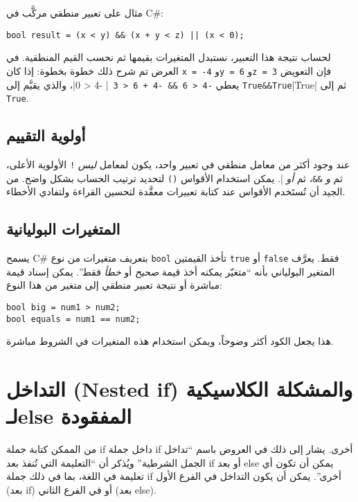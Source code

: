 ﻿\documentclass[12pt]{article}
\begin{document}
مثال على تعبير منطقي مركَّب في C\#:

\begin{english}
\begin{verbatim}
bool result = (x < y) && (x + y < z) || (x < 0);
\end{verbatim}
\end{english}

لحساب نتيجة هذا التعبير، نستبدل المتغيرات بقيمها ثم نحسب القيم المنطقية. في العرض تم شرح ذلك خطوة بخطوة: إذا كان \verb|x = -4| و\verb|y = 6| و\verb|z = 3| فإن التعويض يعطي \verb|-4 < 6 && -4 + 6 < 3 || -4 < 0|، والذي يقيَّم إلى \verb|True&&True||True| ثم إلى \verb|True|.

\subsection{أولوية التقييم}

عند وجود أكثر من معامل منطقي في تعبير واحد، يكون لمعامل \emph{ليس} \verb|!| الأولوية الأعلى، ثم \emph{و} \verb|&&|، ثم \emph{أو} \verb|||. يمكن استخدام الأقواس \verb|()| لتحديد ترتيب الحساب بشكل واضح. من الجيد أن تُستَخدم الأقواس عند كتابة تعبيرات معقَّدة لتحسين القراءة ولتفادي الأخطاء.

\subsection{المتغيرات البوليانية}

يسمح C\# بتعريف متغيرات من نوع \texttt{bool} تأخذ القيمتين \texttt{true} أو \texttt{false} فقط. يعرَّف المتغير البولياني بأنه ``متغيّر يمكنه أخذ قيمة \emph{صحيح} أو \emph{خطأ} فقط''. يمكن إسناد قيمة مباشرة أو نتيجة تعبير منطقي إلى متغير من هذا النوع:


\begin{english}
\begin{verbatim}
bool big = num1 > num2;
bool equals = num1 == num2;
\end{verbatim}
\end{english}

هذا يجعل الكود أكثر وضوحاً، ويمكن استخدام هذه المتغيرات في الشروط مباشرة.

\section{التداخل (\textenglish{Nested if}) والمشكلة الكلاسيكية لـ\textenglish{else} المفقودة}

من الممكن كتابة جملة \textenglish{if} داخل جملة \textenglish{if} أخرى. يشار إلى ذلك في العروض باسم ``تداخل الجمل الشرطية'' ويُذكر أن ``التعليمة التي تُنفذ بعد \textenglish{if} أو بعد \textenglish{else} يمكن أن تكون أي تعليمة في اللغة، بما في ذلك جملة \textenglish{if} أخرى''. يمكن أن يكون التداخل في الفرع الأول (بعد \textenglish{if}) أو في الفرع الثاني (بعد \textenglish{else}).
\end{document}
